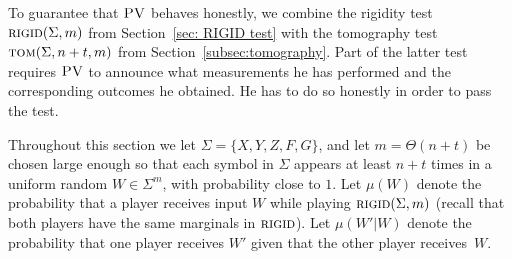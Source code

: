 \documentclass[11pt,letter]{article}
\theoremstyle{remark}
\theoremstyle{definition}
\newcommand{\rigid}{\textsc{rigid}}
\newcommand{\tom}{\textsc{tom}}
\newcommand{\pv}{\textsc{PV}}
\newcommand{\pp}{\textsc{PP}}
\newcommand{\snote}[1]{\textcolor{green}{\small {\textbf{(Stacey:} #1 \textbf{) }}}}
\begin{document}

To guarantee that $\pv$ behaves honestly, we combine the rigidity test $\rigid(\Sigma,m)$ from Section~\ref{sec: RIGID test} with the tomography test $\tom(\Sigma,n+t,m)$ from Section~\ref{subsec:tomography}. Part of the latter test requires $\pv$ to announce
what measurements he has performed and the corresponding outcomes he obtained. He has to do so honestly in order to pass the test.

Throughout this section we let $\Sigma=\{X,Y,Z,F,G\}$, and let $m=\Theta(n+t)$ be chosen large enough so that each symbol in $\Sigma$ appears at least $n+t$ times in a uniform random $W\in\Sigma^m$, with probability close to $1$.
Let $\mu({W})$ denote the probability that a player receives input ${W}$ while playing $\rigid(\Sigma,m)$ (recall that both players have the same marginals in $\rigid$). Let $\mu({W}'|{W})$ denote the probability that one player receives ${W}'$ given that the other player receives~${W}$. %

\end{document}
